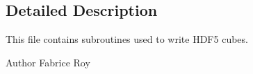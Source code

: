 \subsection{Detailed Description}
This file contains subroutines used to write H\+D\+F5 cubes. 

\begin{DoxyAuthor}{Author}
Fabrice Roy 
\end{DoxyAuthor}
